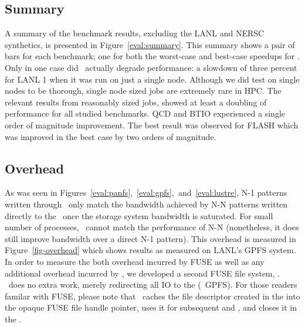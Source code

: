 \subsection{Summary}

A summary of the benchmark results, excluding the LANL and NERSC synthetics, is
presented in Figure~\ref{eval:summary}. This summary shows a pair of bars for
each benchmark; one for both the worst-case and best-case speedups for \plfs.
Only in one case did \plfs\ actually degrade performance: a slowdown of three
percent for LANL 1 when it was run on just a single node. Although we did test
on single nodes to be thorough, single node sized jobs are extremely rare in
HPC. The relevant results from reasonably sized jobs, showed at least a
doubling of performance for all studied benchmarks. QCD and BTIO experienced a
single order of magnitude improvement. The best result was observed for FLASH
which was improved in the best case by two orders of magnitude. 

\subsection{Overhead}
\label{overhead}




As was seen in
Figures~\ref{eval:panfs},~\ref{eval:gpfs},~and~\ref{eval:lustre}, N-1 patterns
written through \plfs\ only match the bandwidth achieved by N-N patterns
written directly to the \upfs\ once the storage system bandwidth is saturated.
For small number of processes, \plfs\ cannot match the performance of N-N
(nonetheless, it does still improve bandwidth over a direct N-1 pattern). This
overhead is measured in Figure~\ref{fig-overhead} which shows results as
measured on LANL's GPFS system. In order to measure the both overhead incurred
by FUSE as well as any additional overhead incurred by \plfs, we developed a
second FUSE file system, \Term{\noopfs}.  \noopfs\ does no extra work, merely
redirecting all IO to the \upfs (\ie\ GPFS). For those readers familar with
FUSE, please note that \noopfs\ caches the file descriptor created in the
 into the opaque FUSE file handle pointer, uses it for subsequent
 and , and closes it in the .

